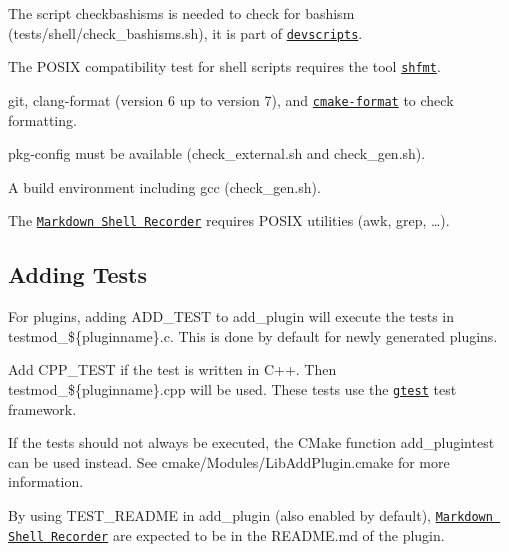 \begin{DoxyItemize}
\item The script {\ttfamily checkbashisms} is needed to check for bashism ({\ttfamily tests/shell/check\+\_\+bashisms.\+sh}), it is part of \href{https://packages.debian.org/jessie/devscripts}{\tt {\ttfamily devscripts}}.
\item The P\+O\+S\+IX compatibility test for shell scripts requires the tool \href{https://github.com/mvdan/sh}{\tt {\ttfamily shfmt}}.
\item {\ttfamily git}, {\ttfamily clang-\/format} (version 6 up to version 7), and \href{https://github.com/cheshirekow/cmake_format}{\tt cmake-\/format} to check formatting.
\item {\ttfamily pkg-\/config} must be available ({\ttfamily check\+\_\+external.\+sh} and {\ttfamily check\+\_\+gen.\+sh}).
\item A build environment including gcc ({\ttfamily check\+\_\+gen.\+sh}).
\item The \href{https://master.libelektra.org/tests/shell/shell_recorder/tutorial_wrapper}{\tt Markdown Shell Recorder} requires P\+O\+S\+IX utilities ({\ttfamily awk}, {\ttfamily grep}, …).
\end{DoxyItemize}

\subsection*{Adding Tests}

For plugins, adding {\ttfamily A\+D\+D\+\_\+\+T\+E\+ST} to {\ttfamily add\+\_\+plugin} will execute the tests in {\ttfamily testmod\+\_\+\$\{pluginname\}.c}. This is done by default for newly generated plugins.

Add {\ttfamily C\+P\+P\+\_\+\+T\+E\+ST} if the test is written in C++. Then {\ttfamily testmod\+\_\+\$\{pluginname\}.cpp} will be used. These tests use the \href{https://github.com/google/googletest}{\tt gtest} test framework.

If the tests should not always be executed, the C\+Make function {\ttfamily add\+\_\+plugintest} can be used instead. See cmake/\+Modules/\+Lib\+Add\+Plugin.\+cmake for more information.

By using {\ttfamily T\+E\+S\+T\+\_\+\+R\+E\+A\+D\+ME} in {\ttfamily add\+\_\+plugin} (also enabled by default), \href{https://master.libelektra.org/tests/shell/shell_recorder/tutorial_wrapper}{\tt Markdown Shell Recorder} are expected to be in the R\+E\+A\+D\+M\+E.\+md of the plugin.

